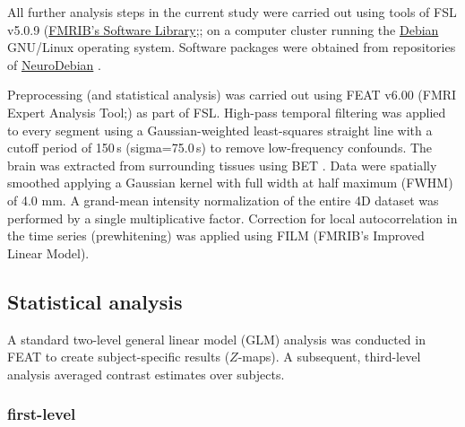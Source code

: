 \documentclass[english]{article}
\begin{document}

All further analysis steps in the current study were carried out using tools of FSL v5.0.9 (\href{''https://www.fmrib.ox.ac.uk/fsl''}{FMRIB's Software Library};\citep{smith2004fsl}; on a computer cluster running the \href{https://www.debian.org}{Debian} GNU/Linux operating system.
Software packages were obtained from repositories of \href{http://neuro.debian.net}{NeuroDebian} \citep{halchenko2012open}.

Preprocessing (and statistical analysis) was carried out using FEAT v6.00 (FMRI Expert Analysis Tool;\citep{woolrich2001autocorr}) as part of FSL.
High-pass temporal filtering was applied to every segment using a Gaussian-weighted least-squares straight line with a cutoff period of 150\,s (sigma=75.0\,s) to remove low-frequency confounds.
The brain was extracted from surrounding tissues using BET \citep{smith2002bet}.
Data were spatially smoothed applying a Gaussian kernel with full width at half maximum (FWHM) of 4.0 mm.
A grand-mean intensity normalization of the entire 4D dataset was performed by a single multiplicative factor.
Correction for local autocorrelation in the time series (prewhitening) was applied using FILM (FMRIB’s Improved Linear Model).

\subsection{Statistical analysis}
A standard two-level general linear model (GLM) analysis was conducted in FEAT to create subject-specific results ($Z$-maps). A subsequent, third-level analysis averaged contrast estimates over subjects.

\subsubsection{first-level}
\end{document}
